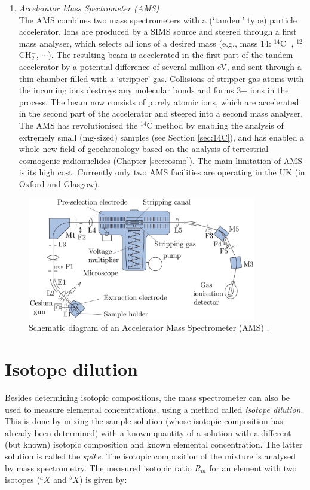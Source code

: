 \documentclass{book}
\newif\ifpdf
\begin{document}
\begin{enumerate}
\item{\emph{Accelerator Mass Spectrometer (AMS)}}\\ The AMS combines
  two mass spectrometers with a (`tandem' type) particle accelerator.
  Ions are produced by a SIMS source and steered through a first mass
  analyser, which selects all ions of a desired mass (e.g., mass 14:
  $^{14}$C$^-$, ${}^{12}$CH$_2^-$, $\cdots$). The resulting beam is
  accelerated in the first part of the tandem accelerator by a
  potential difference of several million eV, and sent through a thin
  chamber filled with a `stripper' gas. Collisions of stripper gas
  atoms with the incoming ions destroys any molecular bonds and forms
  3+ ions in the process. The beam now consists of purely atomic ions,
  which are accelerated in the second part of the accelerator and
  steered into a second mass analyser. The AMS has revolutionised the
  $^{14}$C method by enabling the analysis of extremely small
  (mg-sized) samples (see Section \ref{sec:14C}), and has enabled a
  whole new field of geochronology based on the analysis of
  terrestrial cosmogenic radionuclides (Chapter \ref{sec:cosmo}). The
  main limitation of AMS is its high cost. Currently only two AMS
  facilities are operating in the UK (in Oxford and Glasgow).
\end{enumerate}

\begin{figure}[!ht]
  \centering
  \ifpdf
  \def\svgwidth{\textwidth}
  
  \else
  \includegraphics[width=10cm]{AMS.png}
  \fi
  \caption{Schematic diagram of an Accelerator Mass Spectrometer (AMS)
    \citep[modified from][]{allegre2008}.}
  \label{fig:AMS}
\end{figure}

\section{Isotope dilution}
\label{sec:isotope-dilution}

Besides determining isotopic compositions, the mass spectrometer can
also be used to measure elemental concentrations, using a method
called \emph{isotope dilution}. This is done by mixing the sample
solution (whose isotopic composition has already been determined) with
a known quantity of a solution with a different (but known) isotopic
composition and known elemental concentration. The latter solution is
called the \emph{spike}.  The isotopic composition of the mixture is
analysed by mass spectrometry.  The measured isotopic ratio $R_m$ for
an element with two isotopes ($^aX$ and $^{b}X$) is given by:
\end{document}
